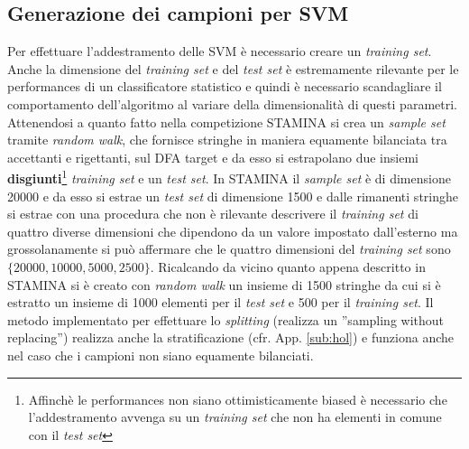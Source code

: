 \subsection{Generazione dei campioni per SVM}
\label{sub:csvm}
Per effettuare l'addestramento delle \ac{SVM} è necessario creare un \textit{training set}. Anche la dimensione del \textit{training set} e del \textit{test set} è estremamente rilevante per le performances di un classificatore statistico e quindi è necessario scandagliare il comportamento dell'algoritmo al variare della dimensionalità di questi parametri. Attenendosi a quanto fatto nella competizione STAMINA \cite{Stamina10} si crea un \textit{sample set} tramite \textit{random walk}, che fornisce stringhe in maniera equamente bilanciata tra accettanti e rigettanti, sul \ac{DFA} target e da esso si estrapolano due insiemi \textbf{disgiunti}\footnote{Affinchè le performances non siano ottimisticamente biased è necessario che l'addestramento avvenga su un \textit{training set} che non ha elementi in comune con il \textit{test set}} \textit{training set} e un \textit{test set}. In STAMINA il \textit{sample set} è di dimensione 20000 e da esso si estrae un \textit{test set} di dimensione 1500 e dalle rimanenti stringhe si estrae con una procedura che non è rilevante descrivere il \textit{training set} di quattro diverse dimensioni che dipendono da un valore impostato dall'esterno ma grossolanamente si può affermare che le quattro dimensioni del \textit{training set} sono $\{20000,10000,5000,2500\}$. Ricalcando da vicino quanto appena descritto in STAMINA si è creato con \textit{random walk} un insieme di 1500 stringhe da cui si è estratto un insieme di 1000 elementi per il \textit{test set} e 500 per il \textit{training set}. Il metodo implementato per effettuare lo \textit{splitting} (realizza un ''sampling without replacing'') realizza anche la stratificazione (cfr. App. \ref{sub:hol}) e funziona anche nel caso che i campioni non siano equamente bilanciati.
